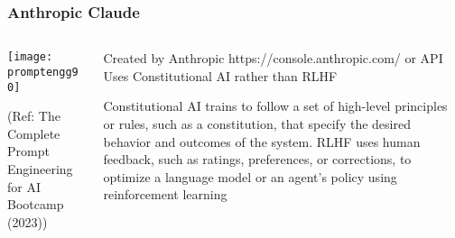\begin{frame}[fragile]\frametitle{Anthropic Claude}


\begin{columns}
    \begin{column}[T]{0.6\linewidth}
		\begin{center}
		\texttt{[image: promptengg90]}

		{\tiny (Ref: The Complete Prompt Engineering for AI Bootcamp (2023))}
		\end{center}	
    \end{column}
    \begin{column}[T]{0.4\linewidth}
		Created by Anthropic 
		https://console.anthropic.com/ or API
		Uses Constitutional AI rather than RLHF
		
		Constitutional AI trains to follow a set of high-level principles or rules, such as a constitution, that specify the desired behavior and outcomes of the system.
		RLHF uses human feedback, such as ratings, preferences, or corrections, to optimize a language model or an agent’s policy using reinforcement learning
    \end{column}
  \end{columns}
\end{frame}




		


